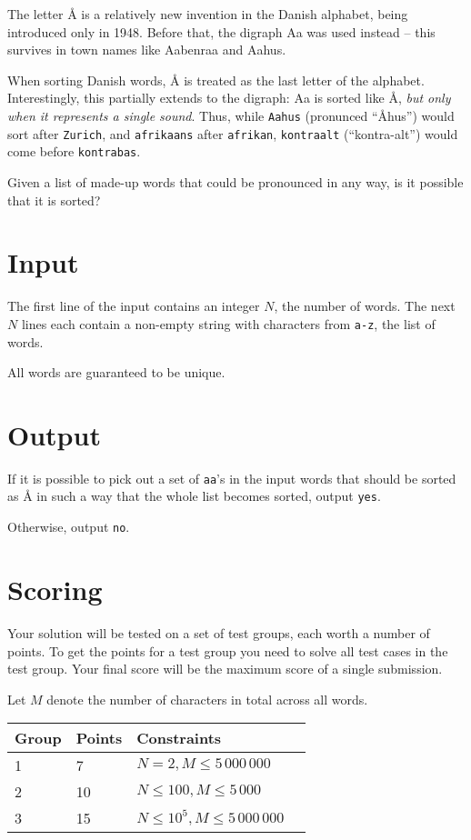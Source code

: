 The letter Å is a relatively new invention in the Danish alphabet, being introduced only in 1948.
Before that, the digraph Aa was used instead -- this survives in town names like Aabenraa and Aahus.

When sorting Danish words, Å is treated as the last letter of the alphabet.
Interestingly, this partially extends to the digraph: Aa is sorted like Å,
\emph{but only when it represents a single sound}.
Thus, while \texttt{Aahus} (pronunced ``Åhus'') would sort after \texttt{Zurich},
and \texttt{afrikaans} after \texttt{afrikan},
\texttt{kontraalt} (``kontra-alt'') would come before \texttt{kontrabas}.

Given a list of made-up words that could be pronounced in any way, is it possible that it is sorted?

\section*{Input}
The first line of the input contains an integer $N$, the number of words.
The next $N$ lines each contain a non-empty string with characters from \texttt{a-z}, the list of words.

All words are guaranteed to be unique.

\section*{Output}
If it is possible to pick out a set of \texttt{aa}'s in the input words that
should be sorted as Å in such a way that the whole list becomes sorted, output \texttt{yes}.

Otherwise, output \texttt{no}.

\section*{Scoring}
Your solution will be tested on a set of test groups, each worth a number of points.
To get the points for a test group you need to solve all test cases in the test group.
Your final score will be the maximum score of a single submission.

Let $M$ denote the number of characters in total across all words.

\noindent
\begin{tabular}{| l | l | l | l |}
\hline
Group & Points & Constraints \\ \hline
1     & 7      & $N = 2, M \le 5\,000\,000$ \\ \hline
2     & 10     & $N \le 100, M \le 5\,000$ \\ \hline
3     & 15     & $N \le 10^5, M \le 5\,000\,000$ \\ \hline
\end{tabular}

